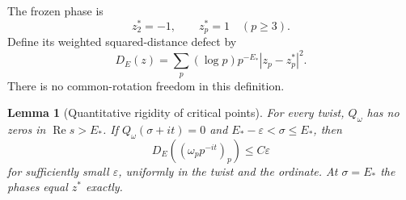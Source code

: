 \documentclass[11pt,letterpaper]{article}
\newtheorem{lemma}[theorem]{Lemma}
\theoremstyle{definition}
\theoremstyle{remark}
\newcommand{\eps}{\varepsilon}
\renewcommand{\Re}{\operatorname{Re}}
\newcommand{\1}{\mathbf 1}
\begin{document}
The frozen phase is
\[
 z^*_2=-1,\qquad z^*_p=1\quad(p\ge3).
\]
Define its weighted squared-distance defect by
\begin{equation}\label{p02:eul:critical-energy}
 D_E(z)=\sum_p(\log p)p^{-E_*}|z_p-z_p^*|^2.
\end{equation}
There is no common-rotation freedom in this definition.

\begin{lemma}[Quantitative rigidity of critical points]
\label{p02:eul:rigidity}
For every twist, $Q_\omega$ has no zeros in $\Re s>E_*$. If
$Q_\omega(\sigma+it)=0$ and $E_*-\eps<\sigma\le E_*$, then
\begin{equation}\label{p02:eul:necessary}
 D_E((\omega_pp^{-it})_p)\le C\eps
\end{equation}
for sufficiently small $\eps$, uniformly in the twist and the ordinate.
At $\sigma=E_*$ the phases equal $z^*$ exactly.
\end{lemma}
\end{document}
